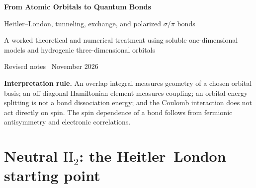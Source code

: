 \documentclass[11pt,letterpaper]{article}
\newcommand{\highlight}[1]{\par\smallskip\noindent\colorbox{pale}{\parbox{0.956\linewidth}{\strut #1\strut}}\smallskip\par}
\begin{document}
\begin{center}
{\fontsize{22}{27}\selectfont\bfseries From Atomic Orbitals to Quantum Bonds}\par\vspace{6pt}
{\Large Heitler--London, tunneling, exchange, and polarized $\sigma$/$\pi$ bonds}\par\vspace{8pt}
{\small A worked theoretical and numerical treatment using soluble one-dimensional models and hydrogenic three-dimensional orbitals}\par\vspace{6pt}
{\small Revised notes \textbullet\ November 2026}
\end{center}
\vspace{8pt}
\begin{abstract}
We start from neutral $\mathrm H_2$ and the Heitler--London spin-coupled electron pair. Two-site, hydrogenic, exactly solvable double-delta, and Gaussian variational models establish the difference between geometric overlap, Hamiltonian hopping, and direct and virtual charge-transfer exchange. The exact one-electron identity $H_{ab}=\langle a|h_B+V_A|b\rangle$ is used only where its eigenstate hypothesis holds. For carbon bonding, we test directed $sp^3$--$sp^3$ and transverse $p$--$p$ orbital ingredients against a full-valence semiempirical electronic-structure calculation for ethane and ethylene. We then construct the corresponding spin-coupled covalent and ionic valence-bond configurations, treating carbon--oxygen polarity in methanol and carbon--hydrogen bonds in methane. The one-electron calculation calibrates bond topology and qualitative polarization, not Heitler--London pair energies. We explicitly distinguish orbital overlap, localized orbital atomic populations, resonance weights, and actual bond energies. Long analytic integrals, numerical recipes, and model limitations appear in appendices.
\end{abstract}
\tableofcontents
\vspace{0.6em}
\highlight{\textbf{Interpretation rule.} An overlap integral measures geometry of a chosen orbital basis; an off-diagonal Hamiltonian element measures coupling; an orbital-energy splitting is not a bond dissociation energy; and the Coulomb interaction does not act directly on spin. The spin dependence of a bond follows from fermionic antisymmetry and electronic correlations.}

\section{Neutral $\mathrm H_2$: the Heitler--London starting point}
\end{document}
